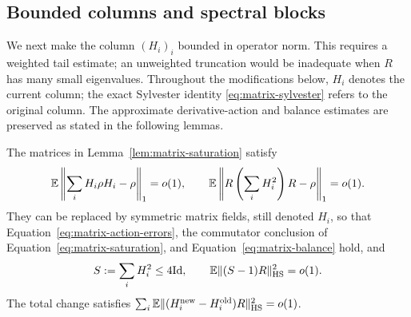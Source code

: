 \subsection{Bounded columns and spectral blocks}

We next make the column $(H_i)_i$ bounded in operator norm.  This requires
a weighted tail estimate; an unweighted truncation would be inadequate
when $R$ has many small eigenvalues.  Throughout the modifications below,
$H_i$ denotes the current column; the exact Sylvester identity
\eqref{eq:matrix-sylvester} refers to the original column.  The approximate
derivative-action and balance estimates are preserved as stated in the
following lemmas.

\begin{lemma}\label{lem:matrix-bounded-column}
The matrices in Lemma~\ref{lem:matrix-saturation} satisfy
\begin{equation}\label{eq:matrix-balance}
 \mathbb E\left\|\sum_iH_i\rho H_i-\rho\right\|_1=o(1),\qquad
 \mathbb E\left\|R\left(\sum_iH_i^2\right)R-\rho\right\|_1=o(1).
\end{equation}
They can be replaced by symmetric matrix fields, still denoted $H_i$, so
that Equation~\eqref{eq:matrix-action-errors}, the commutator conclusion of
Equation~\eqref{eq:matrix-saturation}, and
Equation~\eqref{eq:matrix-balance} hold, and
\begin{equation}\label{eq:matrix-column-bound}
 S:=\sum_iH_i^2\le4\mathrm{Id},\qquad
 \mathbb E\|(S-1)R\|_{\mathrm{HS}}^2=o(1).
\end{equation}
The total change satisfies $\sum_i\mathbb E\|(H_i^{\mathrm{new}}-H_i^{\mathrm{old}})R\|_{\mathrm{HS}}^2=o(1)$.
\end{lemma}
